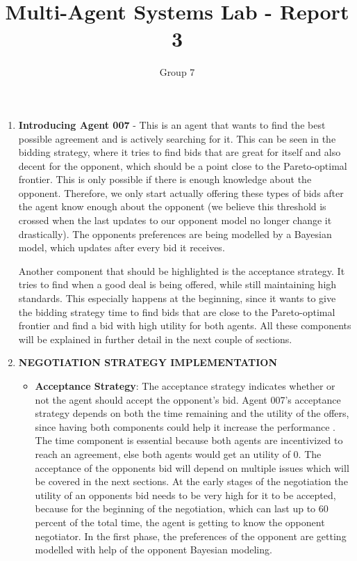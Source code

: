 \documentclass{article}
\title{Multi-Agent Systems Lab - Report 3}
\author{Group 7}
\begin{document}
\maketitle

\begin{enumerate}

\item \textbf{Introducing Agent 007} - This is an agent that wants to find the best possible agreement and is actively searching for it. This can be seen in the bidding strategy, where it tries to find bids that are great for itself and also decent for the opponent, which should be a point close to the Pareto-optimal frontier. This is only possible if there is enough knowledge about the opponent. Therefore, we only start actually offering these types of bids after the agent know enough about the opponent (we believe this threshold is crossed when the last updates to our opponent model no longer change it drastically). The opponents preferences are being modelled by a Bayesian model, which updates after every bid it receives. 

Another component that should be highlighted is the acceptance strategy. It tries to find when a good deal is being offered, while still maintaining high standards. This especially happens at the beginning, since it wants to give the bidding strategy time to find bids that are close to the Pareto-optimal frontier and find a bid with high utility for both agents. All these components will be explained in further detail in the next couple of sections.

\item \textbf{NEGOTIATION STRATEGY IMPLEMENTATION}

\begin{itemize}

\item \textbf{Acceptance Strategy}: The acceptance strategy indicates whether or not the agent should accept the opponent's bid. Agent 007's acceptance strategy depends on both the time remaining and the utility of the offers, since having both components could help it increase the performance \cite{baarslag}. The time component is essential because both agents are incentivized to reach an agreement, else both agents would get an utility of 0. The acceptance of the opponents bid will depend on multiple issues which will be covered in the next sections. At the early stages of the negotiation the utility of an opponents bid needs to be very high for it to be accepted, because for the beginning of the negotiation, which can last up to 60 percent of the total time, the agent is getting to know the opponent negotiator. In the first phase, the preferences of the opponent are getting modelled with help of the opponent Bayesian modeling.


\end{itemize}
\end{enumerate}
\end{document}
